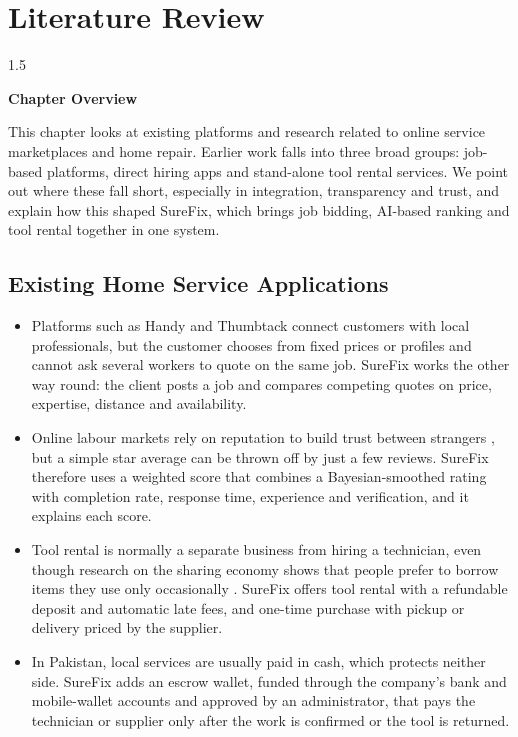 \documentclass[A4paper,12pt]{report}
\theoremstyle{plain}
\theoremstyle{definition}
\theoremstyle{remark}
\numberwithin{equation}{section}
\begin{document}
\chapter{Literature Review}
\thispagestyle{empty}
\newpage
\begin{spacing}{1.5}

\thispagestyle{empty}

{\centering \Large \bfseries Chapter Overview \par}
\vspace{1cm} %

This chapter looks at existing platforms and research related to online service marketplaces and home repair. Earlier work falls into three broad groups: job-based platforms, direct hiring apps and stand-alone tool rental services. We point out where these fall short, especially in integration, transparency and trust, and explain how this shaped SureFix, which brings job bidding, AI-based ranking and tool rental together in one system.

\end{spacing}


\section{Existing Home Service Applications}

\begin{itemize}
        \item Platforms such as Handy and Thumbtack \cite{1,2} connect customers with local professionals, but the customer chooses from fixed prices or profiles and cannot ask several workers to quote on the same job. SureFix works the other way round: the client posts a job and compares competing quotes on price, expertise, distance and availability.
    \item Online labour markets rely on reputation to build trust between strangers \cite{3,4,5}, but a simple star average can be thrown off by just a few reviews. SureFix therefore uses a weighted score that combines a Bayesian-smoothed rating with completion rate, response time, experience and verification, and it explains each score.
    \item Tool rental is normally a separate business from hiring a technician, even though research on the sharing economy shows that people prefer to borrow items they use only occasionally \cite{6,7}. SureFix offers tool rental with a refundable deposit and automatic late fees, and one-time purchase with pickup or delivery priced by the supplier.
    \item In Pakistan, local services are usually paid in cash, which protects neither side. SureFix adds an escrow wallet, funded through the company's bank and mobile-wallet accounts and approved by an administrator, that pays the technician or supplier only after the work is confirmed or the tool is returned.
\end{itemize} 
\end{document}
